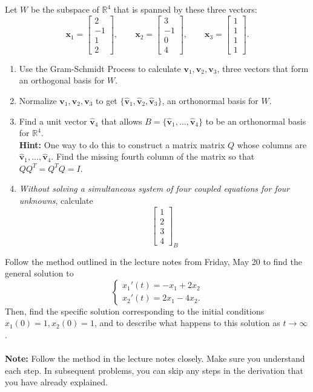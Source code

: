 \documentclass[12pt,letterpaper]{hmcpset}
\newcommand{\RR}{\mathbb{R}}
\newcommand{\m}[1]{\begin{bmatrix} #1 \end{bmatrix}}
\newcommand{\hatbf}[1]{\hat{\mathbf{#1}}}
\begin{document}
\begin{problem}[2]
    Let $W$ be the subspace of $\RR^4$ that is spanned by these three
    vectors:
    \[
        \mathbf{x}_1=\m{2\\-1\\1\\2},\qquad\mathbf{x}_2=\m{3\\-1\\0\\4},\qquad
        \mathbf{x}_3=\m{1\\1\\1\\1}.
    \]
    \begin{enumerate}
        \item Use the Gram-Schmidt Process to calculate $\mathbf{v}_1,
            \mathbf{v}_2,\mathbf{v}_3$, three vectors that form an
            orthogonal basis for $W$.
        \item Normalize $\mathbf{v}_1,\mathbf{v}_2,\mathbf{v}_3$ to
            get $\{\hatbf{v}_1,\hatbf{v}_2,\hatbf{v}_3\}$, an
            orthonormal basis for $W$.
        \item Find a unit vector $\hatbf{v}_4$ that allows
            $B=\{\hatbf{v}_1,\dots,\hatbf{v}_4\}$ to be an orthonormal
            basis for $\RR^4$.\\
            \textbf{Hint:} One way to do this to construct a matrix
            matrix $Q$ whose columns are
            $\hatbf{v}_1,\dots,\hatbf{v}_4$. Find the missing fourth
            column of the matrix so that $QQ^T=Q^TQ=I$.
        \item \textit{Without solving a simultaneous system of four
            coupled equations for four unknowns}, calculate
            \[
                \m{1\\2\\3\\4}_B
            \]
    \end{enumerate}
\end{problem}
\begin{solution}
    \vfill
\end{solution}
\newpage

\begin{problem}[3]
    Follow the method outlined in the lecture notes from Friday, May
    20 to find the general solution to
    \[
        \begin{cases}
            x_1'(t)=-x_1+2x_2\\
            x_2'(t)=2x_1-4x_2.
        \end{cases}
    \]
    Then, find the specific solution corresponding to the initial
    conditions $x_1(0)=1,x_2(0)=1$, and to describe what happens to
    this solution as $t\to\infty$.\\\\
    \textbf{Note:} Follow the method in the lecture notes
    closely. Make sure you understand each step. In subsequent
    problems, you can skip any steps in the derivation that you have
    already explained.
\end{problem}
\begin{solution}
    \vfill
\end{solution}
\newpage
\end{document}
